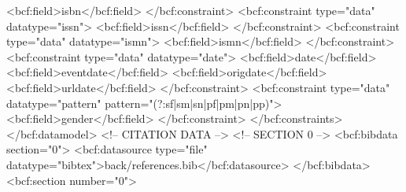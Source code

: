        <bcf:field>isbn</bcf:field>
      </bcf:constraint>
      <bcf:constraint type="data" datatype="issn">
        <bcf:field>issn</bcf:field>
      </bcf:constraint>
      <bcf:constraint type="data" datatype="ismn">
        <bcf:field>ismn</bcf:field>
      </bcf:constraint>
      <bcf:constraint type="data" datatype="date">
        <bcf:field>date</bcf:field>
        <bcf:field>eventdate</bcf:field>
        <bcf:field>origdate</bcf:field>
        <bcf:field>urldate</bcf:field>
      </bcf:constraint>
      <bcf:constraint type="data" datatype="pattern" pattern="(?:sf|sm|sn|pf|pm|pn|pp)">
        <bcf:field>gender</bcf:field>
      </bcf:constraint>
    </bcf:constraints>
  </bcf:datamodel>
  <!-- CITATION DATA -->
  <!-- SECTION 0 -->
  <bcf:bibdata section="0">
    <bcf:datasource type="file" datatype="bibtex">back/references.bib</bcf:datasource>
  </bcf:bibdata>
  <bcf:section number="0">

